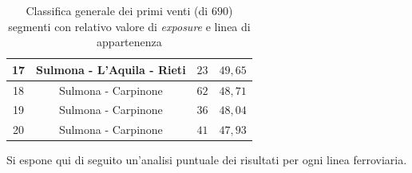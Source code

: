 \begin{table}[h]
\begin{tabular}{|c|c|c|c|}
17 & Sulmona - L'Aquila - Rieti & $23$        & $49,65$                     \\ \hline \rowcolor{flamingopink}
18 & Sulmona - Carpinone        & $62$        & $48,71$                     \\ \hline \rowcolor{flamingopink}
19 & Sulmona - Carpinone        & $36$        & $48,04$                     \\ \hline \rowcolor{flamingopink}
20 & Sulmona - Carpinone        & $41$        & $47,93$                     \\ \hline 
\end{tabular}
\caption{Classifica generale dei primi venti (di $690$) segmenti con relativo valore di \textit{exposure} e linea di appartenenza}
\label{top20segmenti}
\end{table} 
\newpage
Si espone qui di seguito un'analisi puntuale dei risultati per ogni linea ferroviaria.

